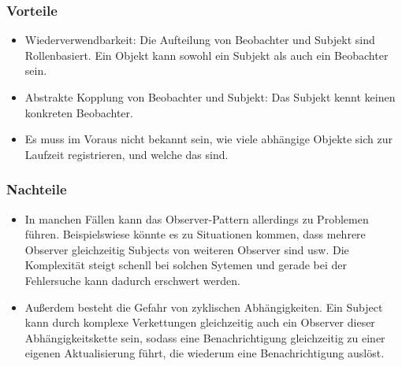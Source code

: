 \subsubsection{Vorteile}
\begin{itemize}
\item Wiederverwendbarkeit: Die Aufteilung von Beobachter und Subjekt sind Rollenbasiert. Ein Objekt kann sowohl ein Subjekt als auch ein Beobachter sein.
\item Abstrakte Kopplung von Beobachter und Subjekt: Das Subjekt kennt keinen konkreten Beobachter.  
\item Es muss im Voraus nicht bekannt sein, wie viele abhängige Objekte sich zur Laufzeit registrieren, und welche das sind.
\end{itemize}
\subsubsection{Nachteile}
\begin{itemize}
\item In manchen Fällen kann das Observer-Pattern allerdings zu Problemen führen. Beispielswiese könnte es zu Situationen kommen, dass mehrere Observer gleichzeitig Subjects von weiteren Observer sind usw. Die Komplexität steigt schenll bei solchen Sytemen und gerade bei der Fehlersuche kann dadurch erschwert werden.
\item Außerdem besteht die Gefahr von zyklischen Abhängigkeiten. Ein Subject kann durch komplexe Verkettungen gleichzeitig auch ein Observer dieser Abhängigkeitskette sein, sodass eine Benachrichtigung gleichzeitig zu einer eigenen Aktualisierung führt, die wiederum  eine Benachrichtigung auslöst.
\end{itemize}
